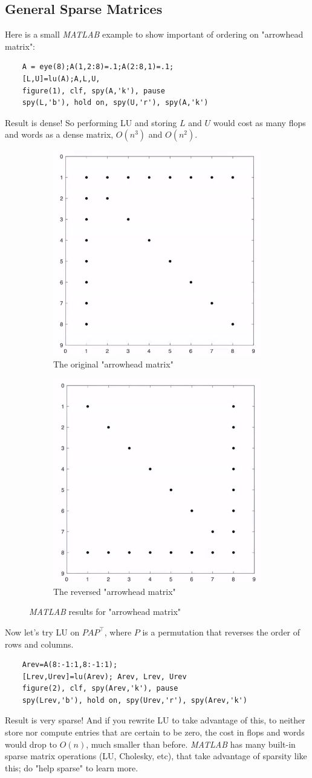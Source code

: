 \documentclass[11pt]{article}
\numberwithin{equation}{section}
\begin{document}
\subsection{General Sparse Matrices}
Here is a small \textit{MATLAB} example to show important of ordering on "arrowhead matrix":
\begin{verbatim}
    A = eye(8);A(1,2:8)=.1;A(2:8,1)=.1;
    [L,U]=lu(A);A,L,U,
    figure(1), clf, spy(A,'k'), pause
    spy(L,'b'), hold on, spy(U,'r'), spy(A,'k')
\end{verbatim}
Result is dense! So performing LU and storing $L$ and $U$ would cost as many flops and words as a dense matrix, $O(n^3)$ and $O(n^2)$. 

\begin{figure}[h]
    \centering
    \begin{subfigure}{.5\textwidth}
      \centering
      \includegraphics[width=.4\linewidth]{images/lec6-4.png}
      \caption{The original "arrowhead matrix"}
    \end{subfigure}%
    \begin{subfigure}{.5\textwidth}
      \centering
      \includegraphics[width=.4\linewidth]{images/lec6-5.png}
      \caption{The reversed "arrowhead matrix"}
    \end{subfigure}
    \caption{\textit{MATLAB} results for "arrowhead matrix"}
\end{figure}

Now let's try LU on $PAP^\top$, where $P$ is a permutation that reverses the order of rows and columns.
\begin{verbatim}
    Arev=A(8:-1:1,8:-1:1);
    [Lrev,Urev]=lu(Arev); Arev, Lrev, Urev
    figure(2), clf, spy(Arev,'k'), pause
    spy(Lrev,'b'), hold on, spy(Urev,'r'), spy(Arev,'k')
\end{verbatim}
Result is very sparse! And if you rewrite LU to take advantage of this, to neither store nor compute entries that are certain to be zero, 
the cost in flops and words would drop to $O(n)$, much smaller than before. \textit{MATLAB} has many built-in sparse matrix operations (LU, Cholesky, etc), 
that take advantage of sparsity like this; do "help sparse" to learn more.
\end{document}
